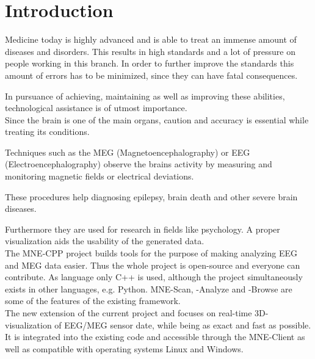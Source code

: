 
\section{Introduction}

	Medicine today is highly advanced and is able to treat an immense amount of diseases and disorders.
	This results in high standards and a lot of pressure on people working in this branch. In order to further improve the 			standards this amount of errors has to be minimized, since they can have fatal consequences.

	In pursuance of achieving, maintaining as well as improving these abilities, technological assistance is of utmost 				importance.\\  

	Since the brain is one of the main organs, caution and accuracy is essential while treating its conditions. 
	
	Techniques such as the MEG (Magnetoencephalography) or EEG (Electroencephalography) observe the brains activity by 				measuring and monitoring magnetic fields or electrical deviations.

	These procedures help diagnosing epilepsy, brain death and other severe brain diseases.

	Furthermore they are used for research in fields like psychology.
	A proper visualization aids the usability of the generated data. \\

	The MNE-CPP  project builds tools for the purpose of making analyzing EEG and MEG data easier.
	Thus the whole project is open-source and everyone can contribute. As language only C++ is used, although the project 			simultaneously exists in other languages, e.g. Python. %
	MNE-Scan, -Analyze and -Browse are some of the features of the existing framework. \\

	The new extension of the current project and focuses on real-time 3D-visualization of EEG/MEG sensor date, while being as 		exact and fast as possible. It is integrated into the existing code and accessible through the MNE-Client as well as 			compatible with operating systems Linux and Windows.
  
